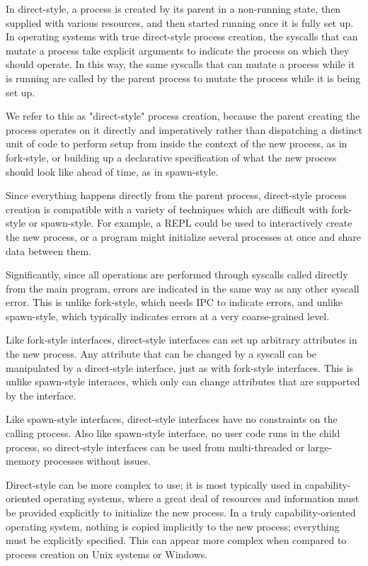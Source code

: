 \documentclass[letterpaper,twocolumn,10pt]{article}
\begin{document}
In direct-style, a process is created by its parent in a non-running state,
then supplied with various resources,
and then started running once it is fully set up.
In operating systems with true direct-style process creation,
the syscalls that can mutate a process
take explicit arguments to indicate the process on which they should operate.
In this way, the same syscalls that can mutate a process while it is running
are called by the parent process to mutate the process while it is being set up.

We refer to this as "direct-style" process creation,
because the parent creating the process operates on it directly and imperatively
rather than dispatching a distinct unit of code to perform setup from inside the context of the new process,
as in fork-style,
or building up a declarative specification of what the new process should look like ahead of time,
as in spawn-style.

Since everything happens directly from the parent process,
direct-style process creation is compatible with a variety of techniques
which are difficult with fork-style or spawn-style.
For example, a REPL could be used to interactively create the new process,
or a program might initialize several processes at once and share data between them.

Significantly,
since all operations are performed through syscalls called directly from the main program,
errors are indicated in the same way as any other syscall error.
This is unlike fork-style, which needs IPC to indicate errors,
and unlike spawn-style, which typically indicates errors at a very coarse-grained level.

Like fork-style interfaces,
direct-style interfaces can set up arbitrary attributes in the new process.
Any attribute that can be changed by a syscall
can be manipulated by a direct-style interface,
just as with fork-style interfaces.
This is unlike spawn-style interaces,
which only can change attributes that are supported by the interface.

Like spawn-style interfaces,
direct-style interfaces have no constraints on the calling process.
Also like spawn-style interface,
no user code runs in the child process, so
direct-style interfaces can be used from multi-threaded or large-memory processes without issues.

Direct-style can be more complex to use;
it is most typically used in capability-oriented operating systems,
where a great deal of resources and information must be provided explicitly to initialize the new process.
In a truly capability-oriented operating system,
nothing is copied implicitly to the new process;
everything must be explicitly specified.
This can appear more complex
when compared to process creation on Unix systems or Windows.
\end{document}
